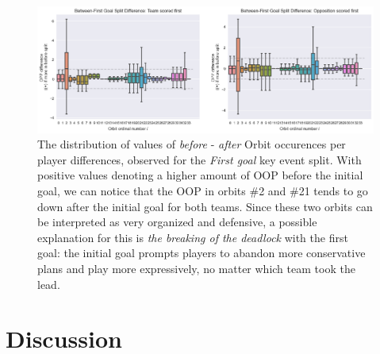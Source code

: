 \documentclass[9pt,twocolumn,twoside]{pnas-report}
\begin{document}
\begin{figure}[t]\centering
	\includegraphics[width=\linewidth]{OrbitGoals.png}
	\caption{The distribution of values of \textit{before} - \textit{after} Orbit occurences per player differences, observed for the \textit{First goal} key event split. With positive values denoting a higher amount of OOP before the initial goal, we can notice that the OOP in orbits \#2 and \#21 tends to go down after the initial goal for both teams. Since these two orbits can be interpreted as very organized and defensive, a possible explanation for this is \textit{the breaking of the deadlock} with the first goal: the initial goal prompts players to abandon more conservative plans and play more expressively, no matter which team took the lead.}
	\label{fig:OrbitsGoals}
\end{figure}




\section*{Discussion}
\end{document}

